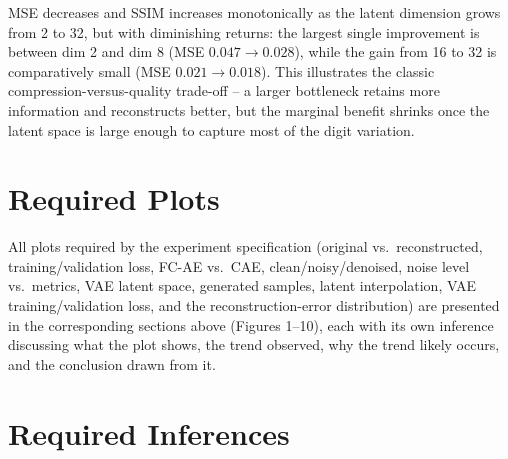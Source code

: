 \documentclass[10pt]{article}
\begin{document}
MSE decreases and SSIM increases monotonically as the latent dimension grows from 2 to 32, but with
diminishing returns: the largest single improvement is between dim 2 and dim 8 (MSE $0.047\to0.028$),
while the gain from 16 to 32 is comparatively small (MSE $0.021\to0.018$). This illustrates the classic
compression-versus-quality trade-off -- a larger bottleneck retains more information and reconstructs
better, but the marginal benefit shrinks once the latent space is large enough to capture most of the
digit variation.

\section{Required Plots}

All plots required by the experiment specification (original vs.\ reconstructed, training/validation
loss, FC-AE vs.\ CAE, clean/noisy/denoised, noise level vs.\ metrics, VAE latent space, generated
samples, latent interpolation, VAE training/validation loss, and the reconstruction-error distribution)
are presented in the corresponding sections above (Figures 1--10), each with its own inference discussing
what the plot shows, the trend observed, why the trend likely occurs, and the conclusion drawn from it.

\section{Required Inferences}
\end{document}
